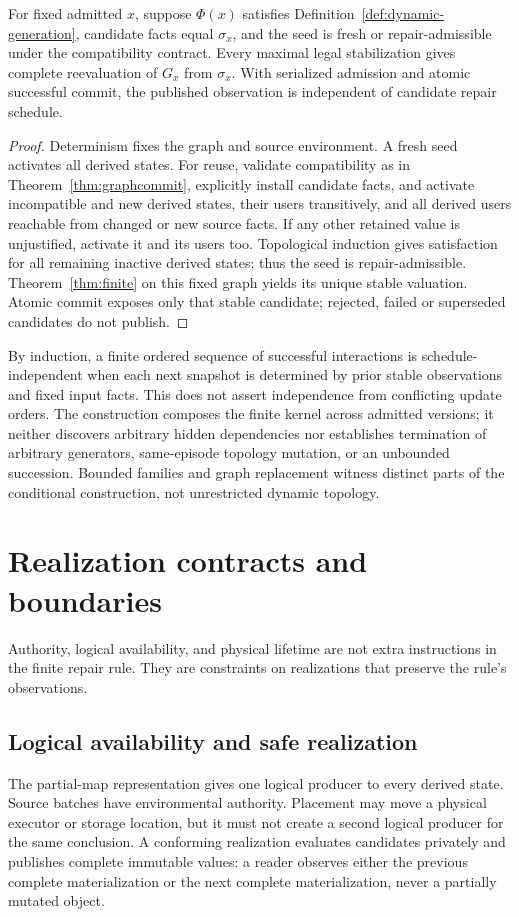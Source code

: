 \begin{theorem}\label{thm:generated-version}
For fixed admitted $x$, suppose $\Phi(x)$ satisfies Definition~\ref{def:dynamic-generation}, candidate facts equal $\sigma_x$, and the seed is fresh or repair-admissible under the compatibility contract. Every maximal legal stabilization gives complete reevaluation of $G_x$ from $\sigma_x$. With serialized admission and atomic successful commit, the published observation is independent of candidate repair schedule.
\end{theorem}
\begin{proof}
Determinism fixes the graph and source environment. A fresh seed activates all derived states. For reuse, validate compatibility as in Theorem~\ref{thm:graphcommit}, explicitly install candidate facts, and activate incompatible and new derived states, their users transitively, and all derived users reachable from changed or new source facts. If any other retained value is unjustified, activate it and its users too. Topological induction gives satisfaction for all remaining inactive derived states; thus the seed is repair-admissible. Theorem~\ref{thm:finite} on this fixed graph yields its unique stable valuation. Atomic commit exposes only that stable candidate; rejected, failed or superseded candidates do not publish.
\end{proof}
By induction, a finite ordered sequence of successful interactions is schedule-independent when each next snapshot is determined by prior stable observations and fixed input facts. This does not assert independence from conflicting update orders. The construction composes the finite kernel across admitted versions; it neither discovers arbitrary hidden dependencies nor establishes termination of arbitrary generators, same-episode topology mutation, or an unbounded succession. Bounded families and graph replacement witness distinct parts of the conditional construction, not unrestricted dynamic topology.

\section{Realization contracts and boundaries}\label{sec:realization}
Authority, logical availability, and physical lifetime are not extra instructions in the finite repair rule. They are constraints on realizations that preserve the rule's observations.

\subsection{Logical availability and safe realization}
The partial-map representation gives one logical producer to every derived state. Source batches have environmental authority. Placement may move a physical executor or storage location, but it must not create a second logical producer for the same conclusion. A conforming realization evaluates candidates privately and publishes complete immutable values: a reader observes either the previous complete materialization or the next complete materialization, never a partially mutated object.

